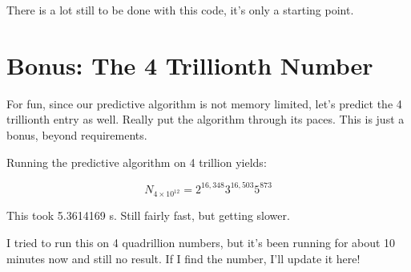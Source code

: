 \documentclass{article}
\begin{document}
There is a lot still to be done with this code, it's only a starting point.


\newpage

\section{Bonus: The 4 Trillionth Number}

For fun, since our predictive algorithm is not memory limited, let's predict the 4 trillionth entry as well. Really put the algorithm through its paces. This is just a bonus, beyond requirements. \newline

Running the predictive algorithm on 4 trillion yields: 

\begin{equation}
    N_{4\times 10^{12}} = 2^{16,348} 3^{16,503} 5^{873}
\end{equation}

This took 5.3614169 s. Still fairly fast, but getting slower. \newline

I tried to run this on 4 quadrillion numbers, but it's been running for about 10 minutes now and still no result. If I find the number, I'll update it here!
\end{document}

